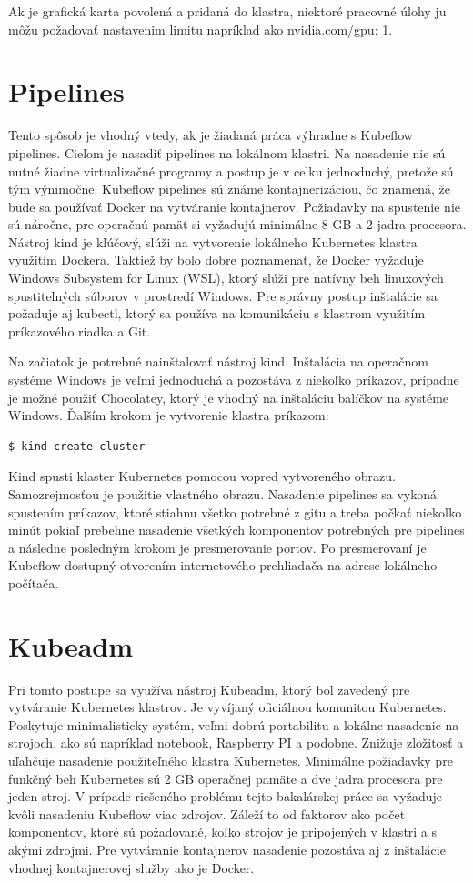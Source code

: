Ak je grafická karta povolená a pridaná do klastra, niektoré pracovné úlohy ju môžu požadovať nastavenim limitu napríklad ako nvidia.com/gpu: 1.

\section{Pipelines}

Tento spôsob je vhodný vtedy, ak je žiadaná práca výhradne s Kubeflow pipelines. Cieľom je nasadiť pipelines na lokálnom klastri. Na nasadenie nie sú nutné žiadne virtualizačné programy a postup je v celku jednoduchý, pretože sú tým výnimočne. Kubeflow pipelines sú známe kontajnerizáciou, čo znamená, že bude sa používať Docker na vytváranie kontajnerov. Požiadavky na spustenie nie sú náročne, pre operačnú pamäť si vyžadujú minimálne 8 GB a 2 jadra procesora. Nástroj kind je kľúčový, slúži na vytvorenie lokálneho Kubernetes klastra využitím Dockera. Taktiež by bolo dobre poznamenať, že Docker vyžaduje Windows Subsystem for Linux (WSL), ktorý slúži pre natívny beh linuxových spustiteľných súborov v prostredí Windows. Pre správny postup inštalácie sa požaduje aj kubectl, ktorý sa používa na komunikáciu s klastrom využitím príkazového riadka a Git.

Na začiatok je potrebné nainštalovať nástroj kind. Inštalácia na operačnom systéme Windows je veľmi jednoduchá a pozostáva z niekoľko príkazov, prípadne je možné použiť Chocolatey, ktorý je vhodný na inštaláciu balíčkov na systéme Windows. Ďalším krokom je vytvorenie klastra príkazom:

\begin{lstlisting}[language=Bash]
    $ kind create cluster
    \end{lstlisting}

Kind spusti klaster Kubernetes pomocou vopred vytvoreného obrazu. Samozrejmosťou je použitie vlastného obrazu. Nasadenie pipelines sa vykoná spustením príkazov, ktoré stiahnu všetko potrebné z gitu a treba počkať niekoľko minút pokiaľ prebehne nasadenie všetkých komponentov potrebných pre pipelines a následne posledným krokom je presmerovanie portov. Po presmerovaní je Kubeflow dostupný otvorením internetového prehliadača na adrese lokálneho počítača.

\section{Kubeadm}

Pri tomto postupe sa využíva nástroj Kubeadm, ktorý bol zavedený pre vytváranie Kubernetes klastrov. Je vyvíjaný oficiálnou komunitou Kubernetes. Poskytuje minimalisticky systém, veľmi dobrú portabilitu a lokálne nasadenie na strojoch, ako sú napríklad notebook, Raspberry PI a podobne. Znižuje zložitosť a uľahčuje nasadenie použiteľného klastra Kubernetes. Minimálne požiadavky pre funkčný beh Kubernetes sú 2 GB operačnej pamäte a dve jadra procesora pre jeden stroj. V prípade riešeného problému tejto bakalárskej práce sa vyžaduje kvôli nasadeniu Kubeflow viac zdrojov. Záleží to od faktorov ako počet komponentov, ktoré sú požadované, koľko strojov je pripojených v klastri a s akými zdrojmi. Pre vytváranie kontajnerov nasadenie pozostáva aj z inštalácie vhodnej kontajnerovej služby ako je Docker.

